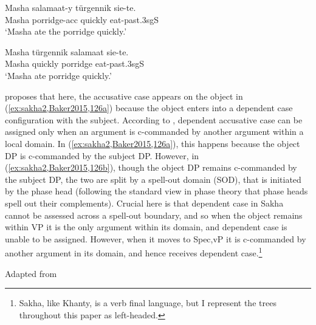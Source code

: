 \documentclass[output=paper
,modfonts
,nonflat]{langsci/langscibook}
\begin{document}
\begin{exe}
\ex {} \label{ex:sakha2,Baker2015,1262}
\begin{xlist}
\ex
\gll Masha salamaat-y türgennik sie-te.\\
Masha porridge-{\sc acc} quickly eat-{\sc past.3sgS}\\
\glt `Masha ate the porridge quickly.' \label{ex:sakha2,Baker2015,126a}

\ex
\gll Masha türgennik salamaat sie-te.\\
Masha quickly porridge eat-{\sc past.3sgS}\\
\glt `Masha ate porridge quickly.'\label{ex:sakha2,Baker2015,126b}
\end{xlist}
\end{exe}


\noindent \citeauthor{Baker2015} proposes that here, the accusative case appears on the object in (\ref{ex:sakha2,Baker2015,126a}) because the object enters into a dependent case configuration with the subject.
According to \citeauthor{Baker2015}, dependent accusative case can be assigned only when an argument is c-commanded by another argument within a local domain.
In (\ref{ex:sakha2,Baker2015,126a}), this happens because the object DP is c-commanded by the subject DP.
However, in (\ref{ex:sakha2,Baker2015,126b}), though the object DP remains c-commanded by the subject DP, the two are split by a spell-out domain (SOD), that is initiated by the phase head (following the standard view in phase theory that phase heads spell out their complements).\largerpage
Crucial here is that dependent case in Sakha cannot be assessed across a spell-out boundary, and so when the object remains within VP it is the only argument within its domain, and dependent case is unable to be assigned. However, when it moves to Spec,vP it is c-commanded by another argument in its domain, and hence receives dependent case.{\footnote{Sakha, like Khanty, is a verb final language, but I represent the trees throughout this paper as left-headed.}}


\begin{exe}
\ex Adapted from \citet[][126]{Baker2015}\\
\end{exe}
\end{document}
